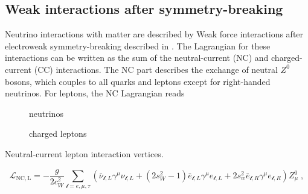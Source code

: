 \subsection{Weak interactions after symmetry-breaking}
Neutrino interactions with matter are described by Weak force interactions after electroweak symmetry-breaking described in .
The Lagrangian for these interactions can be written as the sum of the neutral-current (NC) and charged-current (CC) interactions. The NC part describes the exchange of neutral $Z^0$ bosons, which couples to all quarks and leptons except for right-handed neutrinos. For leptons, the NC Lagrangian reads
\begin{marginfigure}[*-4]
\centering
\begin{subfigure}[t]{0.49\linewidth}
    \caption{neutrinos}
\end{subfigure}
\begin{subfigure}[t]{0.49\linewidth}
    \caption{charged leptons}
\end{subfigure}
\caption{Neutral-current lepton interaction vertices.}
\label{fig:nc-vertices}
\end{marginfigure}
\begin{equation}
  \mathcal{L}_\mathrm{NC,L} = -\frac{g}{2 c_W^2} \sum_{\mathcal{l}=e,\mu,\tau} (\bar{\nu}_{\mathcal{l}, L} \gamma^\mu \nu_{\mathcal{l}, L} + (2 s_W^2 - 1) \bar{e}_{\mathcal{l}, L} \gamma^\mu e_{\mathcal{l}, L} + 2s_w^2 \bar{e}_{\mathcal{l}, R} \gamma^\mu e_{\mathcal{l}, R}) Z^0_\mu\;, \label{eq:ew-nc-lagrangian}
\end{equation}
